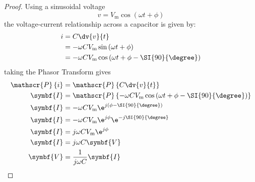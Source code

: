 \documentclass{article}
\begin{document}
\begin{proof}
    Using a sinusoidal voltage
    \begin{equation*}
        v = V_{\mathrm{m}}\cos{\left( \omega t + \phi \right)}
    \end{equation*}
    the voltage-current relationship across a capacitor is given by:
    \begin{align*}
        i & = C \dv{v}{t}                                                                      \\
          & = -\omega C V_{\mathrm{m}} \sin{\left( \omega t + \phi \right)}                    \\
          & = -\omega C V_{\mathrm{m}} \cos{\left( \omega t + \phi - \SI{90}{\degree} \right)}
    \end{align*}
    taking the Phasor Transform gives
    \begin{align*}
        \mathscr{P}\left\{ i \right\} & = \mathscr{P}\left\{ C \dv{v}{t} \right\}                                                                      \\
        \symbf{I}                     & = \mathscr{P}\left\{ -\omega C V_{\mathrm{m}} \cos{\left( \omega t + \phi - \SI{90}{\degree} \right)} \right\} \\
        \symbf{I}                     & = -\omega C V_{\mathrm{m}} \e^{j\left( \phi - \SI{90}{\degree} \right)}                                        \\
        \symbf{I}                     & = -\omega C V_{\mathrm{m}} \e^{j \phi} \e^{-j\SI{90}{\degree}}                                                 \\
        \symbf{I}                     & = j\omega C V_{\mathrm{m}} \e^{j \phi}                                                                         \\
        \symbf{I}                     & = j\omega C \symbf{V}                                                                                          \\
        \symbf{V}                     & = \frac{1}{j\omega C} \symbf{I}
    \end{align*}
\end{proof}
\end{document}
